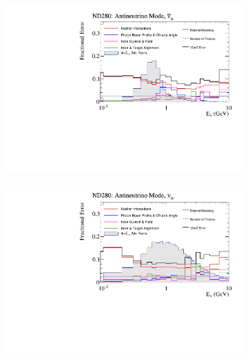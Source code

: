\begin{figure}[h]
	\begin{subfigure}[t]{0.42\textwidth}
		\includegraphics[width=\textwidth, trim={0mm 0mm 0mm 0mm}, clip,page=1]{figures/flux/total_err_nd5_anumode_numub}
	\end{subfigure}
	\begin{subfigure}[t]{0.42\textwidth}
		\includegraphics[width=\textwidth, trim={0mm 0mm 0mm 0mm}, clip,page=1]{figures/flux/total_err_nd5_anumode_numu}
	\end{subfigure}


\end{figure}
